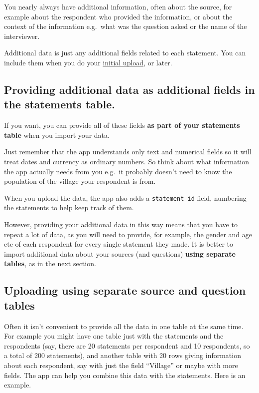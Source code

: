 \documentclass[
]{book}
\begin{document}
You nearly always have additional information, often about the source, for example about the respondent who provided the information, or about the context of the information e.g.~what was the question asked or the name of the interviewer.

Additional data is just any additional fields related to each statement. You can include them when you do your \protect\hyperlink{upload-summary}{initial upload}, or later.

\hypertarget{providing-additional-data-as-additional-fields-in-the-statements-table.}{%
\subsection{Providing additional data as additional fields in the statements table.}\label{providing-additional-data-as-additional-fields-in-the-statements-table.}}

If you want, you can provide all of these fields \textbf{as part of your statements table} when you import your data.

Just remember that the app understands only text and numerical fields so it will treat dates and currency as ordinary numbers. So think about what information the app actually needs from you e.g.~it probably doesn't need to know the population of the village your respondent is from.

When you upload the data, the app also adds a \texttt{statement\_id} field, numbering the statements to help keep track of them.

However, providing your additional data in this way means that you have to repeat a lot of data, as you will need to provide, for example, the gender and age etc of each respondent for every single statement they made. It is better to import additional data about your sources (and questions) \textbf{using separate tables}, as in the next section.

\hypertarget{uploading-using-separate-source-and-question-tables}{%
\subsection{Uploading using separate source and question tables}\label{uploading-using-separate-source-and-question-tables}}

Often it isn't convenient to provide all the data in one table at the same time. For example you might have one table just with the statements and the respondents (say, there are 20 statements per respondent and 10 respondents, so a total of 200 statements), and another table with 20 rows giving information about each respondent, say with just the field ``Village'' or maybe with more fields. The app can help you combine this data with the statements. Here is an example.
\end{document}
